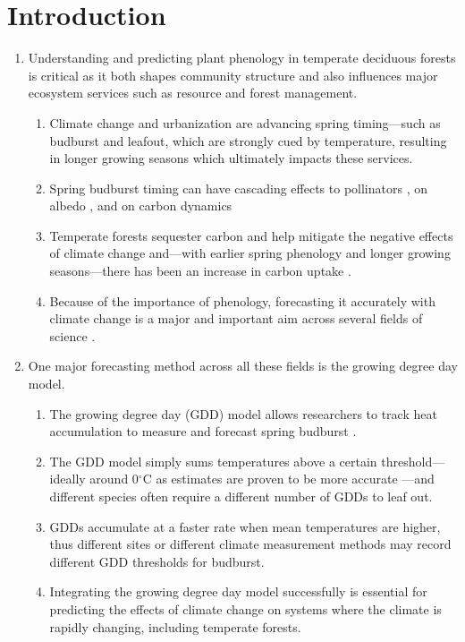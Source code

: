 \documentclass{article}\usepackage[]{graphicx}\usepackage[]{color}
\begin{document}
\section*{Introduction}
\begin{enumerate}
\item Understanding and predicting plant phenology in temperate deciduous forests is critical as it both shapes community structure and also influences major ecosystem services such as resource and forest management. 
  \begin{enumerate} 
  \item Climate change and urbanization are advancing spring timing---such as budburst and leafout, which  are strongly cued by temperature, resulting in longer growing seasons \citep{Chuine2001} which ultimately impacts these services.  
  \item   Spring budburst timing can have cascading effects to pollinators \citep{Boggs2012, Pardee2017}, on albedo \citep{Williamson2016}, and on carbon dynamics \citep{Richardson2013} 
  \item Temperate forests sequester carbon and help mitigate the negative effects of climate change and---with earlier spring phenology and longer growing seasons---there has been an increase in carbon uptake \citep{Keenan2014}.
  \item Because of the importance of phenology, forecasting it accurately with climate change is a major and important aim across several fields of science \citep{Moorcroft2001,Taylor2020,Yu2016,Zhao2012}.
  \end{enumerate}
  
\item One major forecasting method across all these fields is the growing degree day model. 
  \begin{enumerate} 
   \item The growing degree day (GDD) model allows researchers to track heat accumulation to measure and forecast spring budburst \citep{Cook2012,Crimmins2020,Phillimore2013,Schwartz2006,Vitasse2011}.
  \item The GDD model simply sums temperatures above a certain threshold---ideally around 0$^{\circ}$C as estimates are proven to be more accurate \citep{Man2010}---and different species often require a different number of GDDs to leaf out. 
  \item GDDs accumulate at a faster rate when mean temperatures are higher, thus different sites or different climate measurement methods may record different GDD thresholds for budburst. 
  \item  Integrating the growing degree day model successfully is essential for predicting the effects of climate change on systems where the climate is rapidly changing, including temperate forests. 
  \end{enumerate}
  

\end{enumerate}
\end{document}
